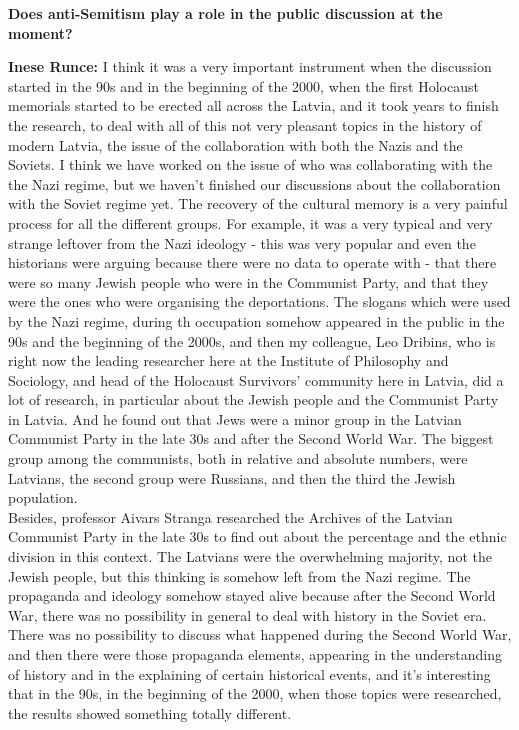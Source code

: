 \textbf{Does anti-Semitism play a role in the public discussion at the moment?}

\textbf{Inese Runce:} I think it was a very important instrument when the discussion started in the 90s and in the beginning of the 2000, when the first Holocaust memorials started to be erected all across the Latvia, and it took years to finish the research, to deal with all of this not very pleasant topics in the history of modern Latvia, the issue of the collaboration with both the Nazis and the Soviets. I think we have worked on the issue of who was collaborating with the the Nazi regime, but we haven’t finished our discussions about the collaboration with the Soviet regime yet.
The recovery of the cultural memory is a very painful process for all the different groups. For example, it was a very typical and very strange leftover from the Nazi ideology - this was very popular and even the historians were arguing because there were no data to operate with - that there were so many Jewish people who were in the Communist Party, and that they were the ones who were organising the deportations. The slogans which were used by the Nazi regime,  during th occupation somehow appeared in the public in the 90s and the beginning of the 2000s, and then my colleague, Leo Dribins, who is right now the leading researcher here at the Institute of Philosophy and Sociology, and head of the Holocaust Survivors' community here in Latvia, did a lot of research, in particular about the Jewish people and the Communist Party in Latvia. And he found out that Jews were a minor group in the Latvian Communist Party in the late 30s and after the Second World War. The biggest group among the communists, both in relative and absolute numbers, were Latvians, the second group were Russians, and then the third the Jewish population.\\
Besides, professor Aivars Stranga researched the Archives of the Latvian Communist Party in the late 30s to find out about the percentage and the ethnic division in this context. The Latvians were the overwhelming majority, not the Jewish people, but this thinking is somehow left from the Nazi regime. The propaganda and ideology somehow stayed alive because after the Second World War, there was no possibility in general to deal with history in the Soviet era. There was no possibility to discuss what happened during the Second World War, and then there were those propaganda elements, appearing in the understanding of history and in the explaining of certain historical events, and it's interesting that in the 90s, in the beginning of the 2000, when those topics were researched, the results showed something totally different.

